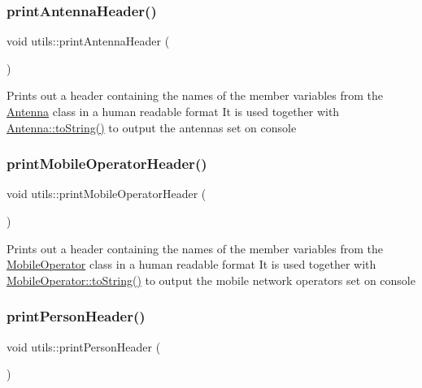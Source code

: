 \subsubsection{\texorpdfstring{print\+Antenna\+Header()}{printAntennaHeader()}}
{\footnotesize\ttfamily void utils\+::print\+Antenna\+Header (\begin{DoxyParamCaption}{ }\end{DoxyParamCaption})}

Prints out a header containing the names of the member variables from the \hyperlink{class_antenna}{Antenna} class in a human readable format It is used together with \hyperlink{class_antenna_a7fea30e065f49a3cbcee02f60bd033c8}{Antenna\+::to\+String()} to output the antennas set on console \mbox{\label{namespaceutils_a207e9d12cc075f601c7fa32ac010b346}} 
\subsubsection{\texorpdfstring{print\+Mobile\+Operator\+Header()}{printMobileOperatorHeader()}}
{\footnotesize\ttfamily void utils\+::print\+Mobile\+Operator\+Header (\begin{DoxyParamCaption}{ }\end{DoxyParamCaption})}

Prints out a header containing the names of the member variables from the \hyperlink{class_mobile_operator}{Mobile\+Operator} class in a human readable format It is used together with \hyperlink{class_mobile_operator_aa83724a149499ef10678ad651a5b40df}{Mobile\+Operator\+::to\+String()} to output the mobile network operators set on console \mbox{\label{namespaceutils_a1978a6ccb2360773215aba027d8b6f08}} 
\subsubsection{\texorpdfstring{print\+Person\+Header()}{printPersonHeader()}}
{\footnotesize\ttfamily void utils\+::print\+Person\+Header (\begin{DoxyParamCaption}{ }\end{DoxyParamCaption})}

